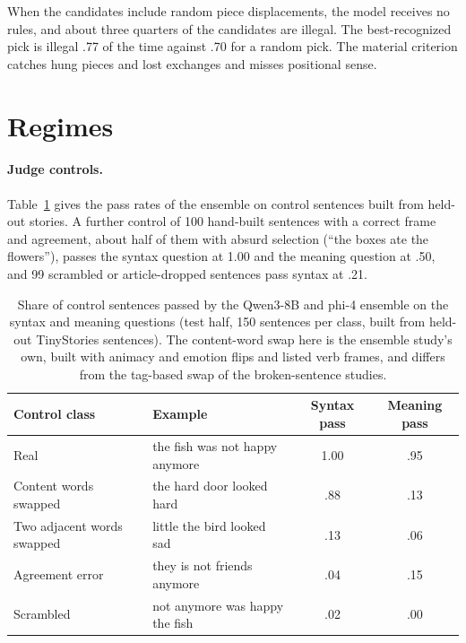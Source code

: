 \documentclass[11pt,letterpaper]{article}
\begin{document}
When the candidates include random piece displacements, the model receives no rules, and about three quarters of the candidates are illegal. The best-recognized pick is illegal .77 of the time against .70 for a random pick.
The material criterion catches hung pieces and lost exchanges and misses positional sense.

\section{Regimes}

\paragraph{Judge controls.} Table~\ref{tab:judge} gives the pass rates of the ensemble on control sentences built from held-out stories. A further control of 100 hand-built sentences with a correct frame and agreement, about half of them with absurd selection (``the boxes ate the flowers''), passes the syntax question at 1.00 and the meaning question at .50, and 99 scrambled or article-dropped sentences pass syntax at .21.

\begin{table}[h]
\caption{Share of control sentences passed by the Qwen3-8B and phi-4 ensemble on the syntax and meaning questions (test half, 150 sentences per class, built from held-out TinyStories sentences).
The content-word swap here is the ensemble study's own, built with animacy and emotion flips and listed verb frames, and differs from the tag-based swap of the broken-sentence studies.}
\label{tab:judge}
\begin{center}
\small
\begin{tabular}{llcc}
\toprule
Control class & Example & Syntax pass & Meaning pass \\
\midrule
Real & the fish was not happy anymore & 1.00 & .95 \\
Content words swapped & the hard door looked hard & .88 & .13 \\
Two adjacent words swapped & little the bird looked sad & .13 & .06 \\
Agreement error & they is not friends anymore & .04 & .15 \\
Scrambled & not anymore was happy the fish & .02 & .00 \\
\bottomrule
\end{tabular}
\end{center}
\end{table}
\end{document}
